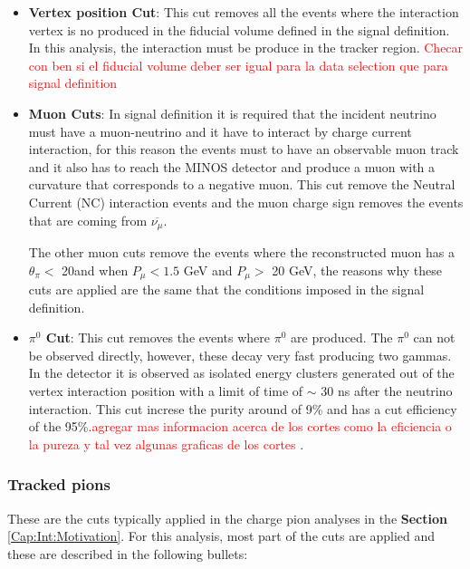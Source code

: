 \begin{itemize}
    \item \textbf{Vertex position Cut}: This cut removes all the events where the interaction vertex is no produced in the fiducial volume defined in the signal definition. In this analysis, the interaction must be produce in the tracker region. \textcolor{red}{Checar con ben si el fiducial volume deber ser igual para la data selection que para signal definition}
    \item \textbf{Muon Cuts}: In signal definition it is required that the incident neutrino must have a muon-neutrino and it have to interact by charge current interaction, for this reason the events must to have an observable muon track and it also has to reach the MINOS detector and produce a muon with a curvature that corresponds to a negative muon. This cut remove the Neutral Current (NC) interaction events and the muon charge sign removes the events that are coming from $\overline{\nu_\mu}$. 
    
    The other muon cuts remove the events where the reconstructed muon has a $\theta_\pi<$ 20\textdegree and when $P_\mu < 1.5$ GeV and $P_\mu>$ 20 GeV, the reasons why these cuts are applied are the same that the conditions imposed in the signal definition.  
    \item \textbf{$\pi^0$ Cut}: This cut removes the events where $\pi^0$ are produced. The $\pi^0$ can not be observed directly, however, these decay very fast producing two gammas. In the detector it is observed as isolated energy clusters generated out of the vertex interaction position with a limit of time of \(\sim\) 30 ns after the neutrino interaction. This cut increse the purity around of 9\% and has a cut efficiency of the 95\%.\textcolor{red}{agregar mas informacion acerca de los cortes como la eficiencia o la pureza y tal vez algunas graficas de los cortes
    }. 
\end{itemize}


\subsubsection{Tracked pions}
\label{Cap:Analysis:DataSelection:Cuts:Tracked}

These are the cuts typically applied in the charge pion analyses in the \textbf{Section} \ref{Cap:Int:Motivation}. For this analysis, most part of the cuts are applied and these are described in the following bullets: 

